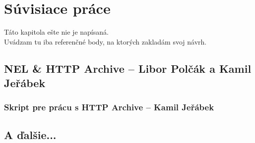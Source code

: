 \chapter{Súvisiace práce}
\label{related-work}

Táto kapitola ešte nie je napísaná.
\\
Uvádzam tu iba referenčné body, na ktorých zakladám svoj návrh.

\section{NEL \& HTTP Archive -- Libor Polčák a Kamil Jeřábek}
\label{praca-veduceho}

\subsection{Skript pre prácu s HTTP Archive -- Kamil Jeřábek}
\label{skript}

\section{A ďalšie...}







